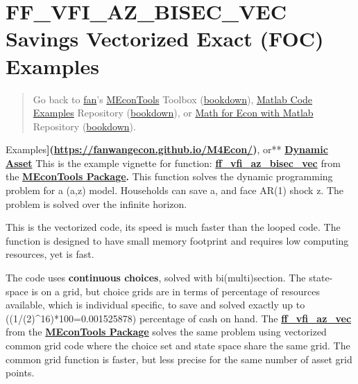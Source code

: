 \documentclass[
]{book}
\begin{document}
\hypertarget{ff_vfi_az_bisec_vec-savings-vectorized-exact-foc-examples}{%
\section{FF\_VFI\_AZ\_BISEC\_VEC Savings Vectorized Exact (FOC) Examples}\label{ff_vfi_az_bisec_vec-savings-vectorized-exact-foc-examples}}

\begin{quote}
Go back to \href{http://fanwangecon.github.io/}{fan}'s \href{https://fanwangecon.github.io/MEconTools/}{MEconTools} Toolbox (\href{https://fanwangecon.github.io/MEconTools/bookdown}{bookdown}), \href{https://fanwangecon.github.io/M4Econ/}{Matlab Code Examples} Repository (\href{https://fanwangecon.github.io/M4Econ/bookdown}{bookdown}), or \href{https://fanwangecon.github.io/Math4Econ/}{Math for Econ with Matlab} Repository (\href{https://fanwangecon.github.io/Math4Econ/bookdown}{bookdown}).
\end{quote}

Examples\textbf{{]}(\url{https://fanwangecon.github.io/M4Econ/})}, or** \href{https://fanwangecon.github.io/CodeDynaAsset/}{\textbf{Dynamic
Asset}}
This is the example vignette for function:
\href{https://github.com/FanWangEcon/MEconTools/blob/master/MEconTools/vfi/ff_vfi_az_bisec_vec.m}{\textbf{ff\_vfi\_az\_bisec\_vec}}
from the \href{https://fanwangecon.github.io/MEconTools/}{\textbf{MEconTools
Package}}\textbf{.} This function
solves the dynamic programming problem for a (a,z) model. Households can
save a, and face AR(1) shock z. The problem is solved over the infinite
horizon.

This is the vectorized code, its speed is much faster than the looped
code. The function is designed to have small memory footprint and
requires low computing resources, yet is fast.

The code uses \textbf{continuous choices}, solved with bi(multi)section. The
state-space is on a grid, but choice grids are in terms of percentage of
resources available, which is individual specific, to save and solved
exactly up to ((1/(2)\^{}16)*100=0.001525878) percentage of cash on hand.
The
\href{https://github.com/FanWangEcon/MEconTools/blob/master/MEconTools/vfi/ff_vfi_az_vec.m}{\textbf{ff\_vfi\_az\_vec}}
from the \href{https://fanwangecon.github.io/MEconTools/}{\textbf{MEconTools
Package}} solves the same
problem using vectorized common grid code where the choice set and state
space share the same grid. The common grid function is faster, but less
precise for the same number of asset grid points.
\end{document}
